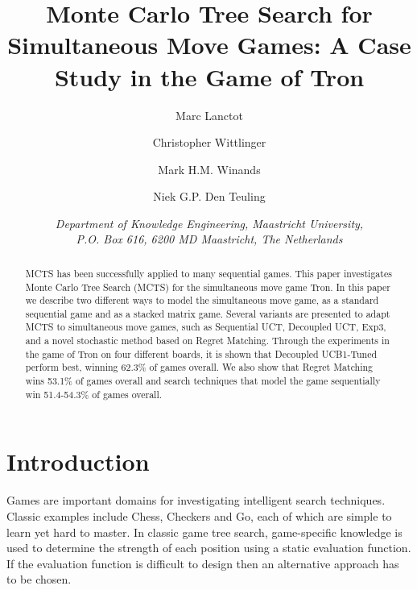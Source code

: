 \documentclass{article}
\title{\textbf{\huge Monte Carlo Tree Search for Simultaneous Move Games: A Case Study in the Game of Tron}}
\author{
    Marc Lanctot\and 
    Christopher Wittlinger \and
    Mark H.M. Winands \and
    Niek G.P. Den Teuling}
\date{\textit{Department of Knowledge Engineering, Maastricht University,\\ P.O. Box 616, 6200 MD Maastricht, The Netherlands}}
\begin{document}
\ttl
\thispagestyle{empty}



\begin{abstract}
\noindent MCTS has been successfully applied to many sequential games. This paper investigates Monte Carlo Tree Search (MCTS) for the simultaneous move game Tron. In this paper we describe two different ways to model the simultaneous move game, as a standard sequential game and as a stacked matrix game. Several variants are presented to adapt MCTS to simultaneous move games, such as Sequential UCT, Decoupled UCT, Exp3, and a novel stochastic method based on Regret Matching. Through the experiments in the game of Tron on four different boards, it is shown that Decoupled UCB1-Tuned perform best, winning 62.3\% of games overall. We also show that Regret Matching wins 53.1\% of games overall and search techniques that model the game sequentially win 51.4-54.3\% of games overall.
\end{abstract}

\section{Introduction}
\label{sec:introduction}
Games are important domains for investigating intelligent search techniques.
Classic examples include Chess, Checkers and Go, each of which are simple to learn yet hard to master.
In classic game tree search, game-specific knowledge is used to determine the strength of each position using a static evaluation function. %
If the evaluation function is difficult to design then an alternative approach has to be chosen. 
\end{document}
